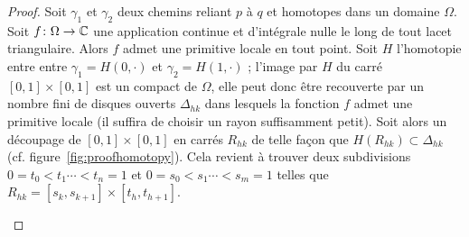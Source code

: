 \begin{proof}
Soit $\gamma_1$ et $\gamma_2$ deux chemins reliant $p$ à $q$ et homotopes dans un domaine $\Omega$. Soit $f \colon \Omega \to \mathbb{C}$ une application continue et d'intégrale nulle le long de tout lacet triangulaire. Alors $f$ admet une primitive locale en tout point. Soit $H$ l'homotopie entre entre $\gamma_1 = H(0,\cdot)$ et $\gamma_2=H(1,\cdot)$ ; l'image par $H$ du carré $[0,1]\times [0,1]$ est un compact de $\Omega$, elle peut donc être recouverte par un nombre fini de disques ouverts $\Delta_{hk}$ dans lesquels la fonction $f$ admet une primitive locale (il suffira de choisir un rayon suffisamment petit). Soit alors un découpage de $[0,1]\times [0,1]$ en carrés $R_{hk}$ de telle façon que $H(R_{hk}) \subset  \Delta_{hk}$ (cf. figure~\ref{fig:proofhomotopy}). Cela revient à trouver deux subdivisions $0=t_0 <t_1\cdots <t_n=1$ et $0=s_0 <s_1\cdots <s_m=1$ telles que $R_{hk} = [s_k,s_{k+1}] \times [t_h, t_{h+1}]$.




%

\begin{figure}[H]
\begin{center}
\shorthandoff{!}\shorthandoff{:}
\begin{tikzpicture}
  [decoration={markings,mark=at position 0.5 with {\arrow{>}}},
   witharrow/.style={postaction={decorate}},
   dot/.style={draw,fill,circle,inner sep=1.5pt,minimum width=0pt}
  ]


\end{tikzpicture}
\end{center}
\end{figure}
\end{proof}
